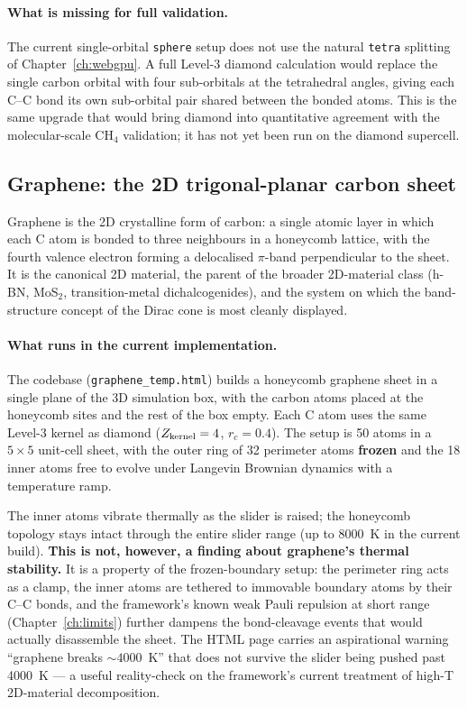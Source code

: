\paragraph{What is missing for full validation.}
The current single-orbital \texttt{sphere} setup does not use the natural \texttt{tetra} splitting of Chapter~\ref{ch:webgpu}. A full Level-3 diamond calculation would replace the single carbon orbital with four sub-orbitals at the tetrahedral angles, giving each C--C bond its own sub-orbital pair shared between the bonded atoms. This is the same upgrade that would bring diamond into quantitative agreement with the molecular-scale CH$_4$ validation; it has not yet been run on the diamond supercell.

\subsection{Graphene: the 2D trigonal-planar carbon sheet}

Graphene is the 2D crystalline form of carbon: a single atomic layer in which each C atom is bonded to three neighbours in a honeycomb lattice, with the fourth valence electron forming a delocalised $\pi$-band perpendicular to the sheet. It is the canonical 2D material, the parent of the broader 2D-material class (h-BN, MoS$_2$, transition-metal dichalcogenides), and the system on which the band-structure concept of the Dirac cone is most cleanly displayed.

\paragraph{What runs in the current implementation.}
The codebase (\texttt{graphene\_temp.html}) builds a honeycomb graphene sheet in a single plane of the 3D simulation box, with the carbon atoms placed at the honeycomb sites and the rest of the box empty. Each C atom uses the same Level-3 kernel as diamond ($Z_{\rm kernel} = 4$, $r_c = 0.4$). The setup is 50 atoms in a $5 \times 5$ unit-cell sheet, with the outer ring of 32 perimeter atoms \textbf{frozen} and the 18 inner atoms free to evolve under Langevin Brownian dynamics with a temperature ramp.

The inner atoms vibrate thermally as the slider is raised; the honeycomb topology stays intact through the entire slider range (up to 8000~K in the current build). \textbf{This is not, however, a finding about graphene's thermal stability.} It is a property of the frozen-boundary setup: the perimeter ring acts as a clamp, the inner atoms are tethered to immovable boundary atoms by their C--C bonds, and the framework's known weak Pauli repulsion at short range (Chapter~\ref{ch:limits}) further dampens the bond-cleavage events that would actually disassemble the sheet. The HTML page carries an aspirational warning ``graphene breaks $\sim 4000$~K'' that does not survive the slider being pushed past 4000~K --- a useful reality-check on the framework's current treatment of high-T 2D-material decomposition.

